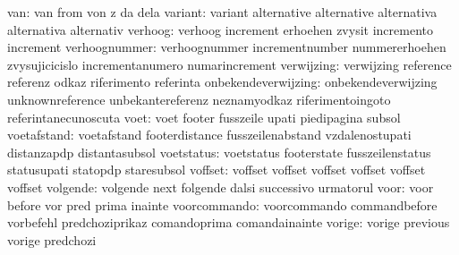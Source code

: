                       van: van                       from
                           von                       z
                           da                        dela
                  variant: variant                   alternative
                           alternative               alternativa
                           alternativa               alternativ
                  verhoog: verhoog                   increment
                           erhoehen                  zvysit
                           incremento                increment %
            verhoognummer: verhoognummer             incrementnumber
                           nummererhoehen            zvysujicicislo
                           incrementanumero          numarincrement
               verwijzing: verwijzing                reference
                           referenz                  odkaz
                           riferimento               referinta
      onbekendeverwijzing: onbekendeverwijzing       unknownreference
                           unbekantereferenz         neznamyodkaz
                           riferimentoingoto         referintanecunoscuta
                     voet: voet                      footer
                           fusszeile                 upati
                           piedipagina               subsol
              voetafstand: voetafstand               footerdistance
                           fusszeilenabstand         vzdalenostupati
                           distanzapdp               distantasubsol
               voetstatus: voetstatus                footerstate
                           fusszeilenstatus          statusupati
                           statopdp                  staresubsol
                  voffset: voffset                   voffset
                           voffset                   voffset
                           voffset                   voffset
                 volgende: volgende                  next
                           folgende                  dalsi
                           successivo                urmatorul
                     voor: voor                      before
                           vor                       pred
                           prima                     inainte
             voorcommando: voorcommando              commandbefore
                           vorbefehl                 predchoziprikaz
                           comandoprima              comandainainte
                   vorige: vorige                    previous
                           vorige                    predchozi
